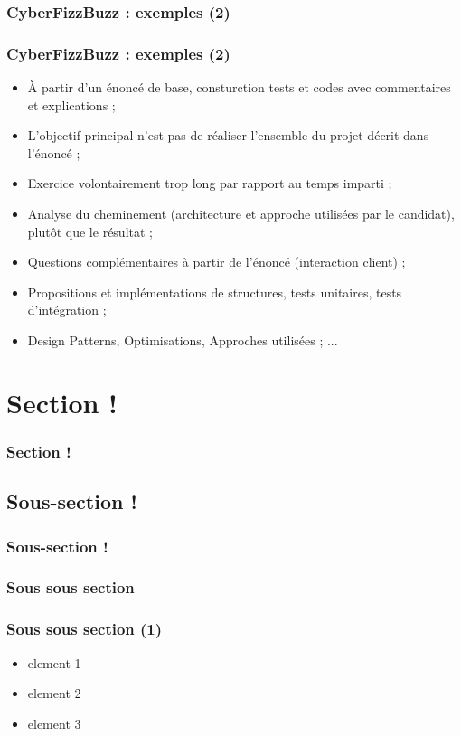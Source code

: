 \documentclass[slidetop,11pt]{beamer}
\begin{document}
\subsubsection{CyberFizzBuzz : exemples (2)}
\begin{frame}
	\frametitle{CyberFizzBuzz : exemples (2)}
	\begin{itemize}
		\item {\`A} partir d'un {\'e}nonc{\'e} de base, consturction tests et codes avec commentaires et explications ; 
		\item L'objectif principal n'est pas de r{\'e}aliser l'ensemble du projet d{\'e}crit dans l'{\'e}nonc{\'e} ; 
		\item Exercice volontairement trop long par rapport au temps imparti ; 
		\item Analyse du cheminement (architecture et approche utilis{\'e}es par le candidat), plut{\^o}t que le r{\'e}sultat ;
		\item Questions compl{\'e}mentaires {\`a} partir de l'{\'e}nonc{\'e} (interaction client) ; 
		\item Propositions  et impl{\'e}mentations de structures, tests unitaires, tests d'int{\'e}gration ;
		\item Design Patterns, Optimisations, Approches utilis{\'e}es ; ... 
	\end{itemize}
\end{frame} 

\section{Section !}
\begin{frame}
	\frametitle{Section !}
	\tableofcontents[sections=2,currentsection,subsectionstyle=show/shaded/hide] %
\end{frame} 

\subsection{Sous-section !}
\begin{frame}
	\frametitle{Sous-section ! }
	\tableofcontents[sections=2,currentsection,subsectionstyle=show/shaded/hide]
\end{frame} 

\subsubsection{Sous sous section}
\begin{frame}
	\frametitle{Sous sous section  (1)}
	\begin{itemize}
		\item element 1
		\item element 2
		\item element 3
	\end{itemize}
\end{frame} 
\end{document}

